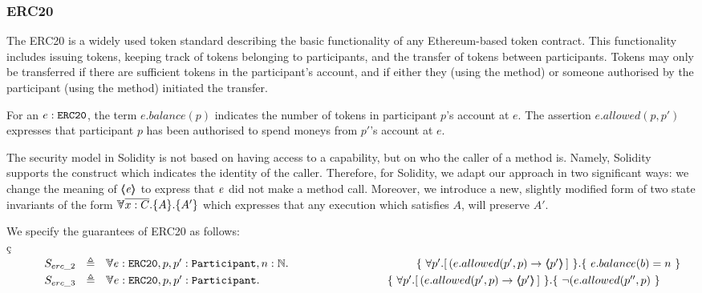 \subsubsection{ERC20}

The ERC20 \cite{ERC20} is a widely used token standard describing the basic functionality of any Ethereum-based token 
contract. 
This functionality includes issuing tokens, keeping track of tokens belonging to participants, and the 
transfer of tokens between participants. Tokens may only be transferred if there are sufficient tokens in the 
participant's account, and if either they (using the  method) or someone authorised by the participant (using the  method) initiated the transfer. 

For an $e:\mbox{\normalfont{\texttt{ERC20}}}$, the term $e.balance(p)$  indicates the number of tokens in   participant $p$'s  account at $e$.
The 
assertion $e.allowed(p,p')$ expresses that participant $p$ has been authorised to spend moneys from $p'$'s account at $e$.
 
The security model in Solidity is not based on having access to a capability, but on who the caller of a method is. 
Namely, Solidity supports the  construct  which indicates the identity of the caller.
Therefore, for Solidity, we adapt our approach in two significant ways:
we change the meaning of $\langle\!\!\langle \mathit{e} \rangle\!\!\rangle$ to express that $\mathit{e}$ did not make a method call.
Moreover, we introduce a new, slightly modified form of two state invariants of the form $\TwoStates{\overline {x:C}}{A}{A'}$ which expresses that any execution which satisfies $A$, will preserve $A'$.


We specify the guarantees of   ERC20  as follows:
\\
ç
\\
$\strut \SPSP  S_{erc\_2}\ \  \triangleq \ \ \TwoStatesLB{ e:\prg{ERC20},p,p':\prg{Participant},n:\mathbb{N}} 
 {\ \forall p'.[\,(e.allowed(p',p) \rightarrow   \inside{p'}\, ] \ } { \ e.balance(b)=n \ } $ 
\\
$\strut \SPSP  S_{erc\_3}\ \  \triangleq \ \ \TwoStatesLB{ e:\prg{ERC20},p,p':\prg{Participant}}  {\ \forall p'.[\,(e.allowed(p',p) \rightarrow   \inside{p'}\, ] \ } { \ \neg (e.allowed(p'',p) \ } $ 


